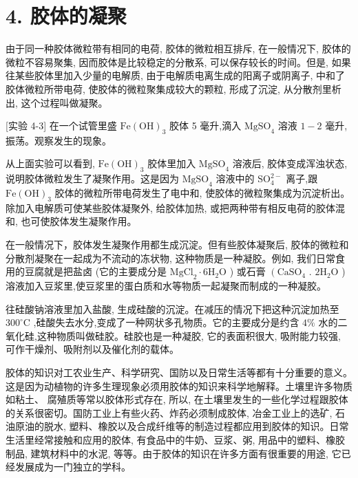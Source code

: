\documentclass[10pt]{article}
\begin{document}
\section*{4. 胶体的凝聚}

由于同一种胶体微粒带有相同的电荷, 胶体的微粒相互排斥, 在一般情况下, 胶体的微粒不容易聚集, 因而胶体是比较稳定的分散系, 可以保存较长的时间。但是, 如果往某些胶体里加入少量的电解质, 由于电解质电离生成的阳离子或阴离子, 中和了胶体微粒所带电荷, 使胶体的微粒聚集成较大的颗粒, 形成了沉淀, 从分散剂里析出, 这个过程叫做凝聚。

[实验 4-3] 在一个试管里盛 \(\mathrm{{Fe}}{\left( \mathrm{{OH}}\right) }_{3}\) 胶体 5 毫升,滴入 \({\mathrm{{MgSO}}}_{4}\) 溶液 \(1 - 2\) 毫升,振荡。观察发生的现象。

从上面实验可以看到, \(\mathrm{{Fe}}{\left( \mathrm{{OH}}\right) }_{3}\) 胶体里加入 \({\mathrm{{MgSO}}}_{4}\) 溶液后, 胶体变成浑浊状态, 说明胶体微粒发生了凝聚作用。这是因为 \({\mathrm{{MgSO}}}_{4}\) 溶液中的 \({\mathrm{{SO}}}_{4}^{2 - }\) 离子,跟 \(\mathrm{{Fe}}{\left( \mathrm{{OH}}\right) }_{3}\) 胶体的微粒所带电荷发生了电中和, 使胶体的微粒聚集成为沉淀析出。 除加入电解质可使某些胶体凝聚外, 给胶体加热, 或把两种带有相反电荷的胶体混和, 也可使胶体发生凝聚作用。

在一般情况下，胶体发生凝聚作用都生成沉淀。但有些胶体凝聚后, 胶体的微粒和分散剂凝聚在一起成为不流动的冻状物, 这种物质是一种凝胶。例如, 我们日常食用的豆腐就是把盐卤 (它的主要成分是 \({\mathrm{{MgCl}}}_{2} \cdot 6{\mathrm{H}}_{2}\mathrm{O}\) ) 或石膏 \(\left( {\mathrm{{CaSO}}}_{4}\right.\) . \(2{\mathrm{H}}_{2}\mathrm{O}\) ) 溶液加入豆浆里,使豆浆里的蛋白质和水等物质一起凝聚而制成的一种凝胶。

往硅酸钠溶液里加入盐酸, 生成硅酸的沉淀。在减压的情况下把这种沉淀加热至 \({300}^{ \circ }\mathrm{C}\) ,硅酸失去水分,变成了一种网状多孔物质。它的主要成分是约含 \(4\%\) 水的二氧化硅,这种物质叫做硅胶。硅胶也是一种凝胶, 它的表面积很大, 吸附能力较强, 可作干燥剂、吸附剂以及催化剂的载体。

胶体的知识对工农业生产、科学研究、国防以及日常生活等都有十分重要的意义。这是因为动植物的许多生理现象必须用胶体的知识来科学地解释。土壤里许多物质如粘土、 腐殖质等常以胶体形式存在, 所以, 在土壤里发生的一些化学过程跟胶体的关系很密切。国防工业上有些火药、炸药必须制成胶体, 冶金工业上的选矿, 石油原油的脱水, 塑料、橡胶以及合成纤维等的制造过程都应用到胶体的知识。日常生活里经常接触和应用的胶体, 有食品中的牛奶、豆浆、粥, 用品中的塑料、橡胶制品, 建筑材料中的水泥, 等等。由于胶体的知识在许多方面有很重要的用途, 它已经发展成为一门独立的学科。
\end{document}
